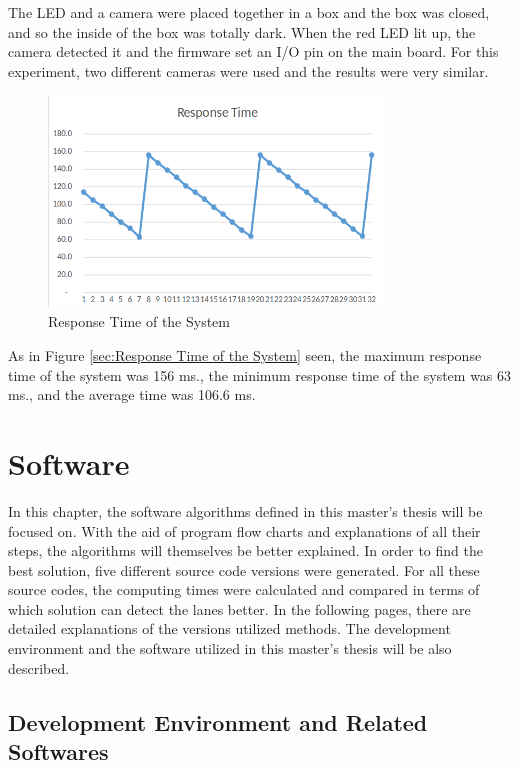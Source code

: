 The LED and a camera were placed together in a box and the box was closed, and so the inside of the box was totally dark. When the red LED lit up, the camera detected it and the firmware set an I/O pin on the main board. For this experiment, two different cameras were used and the results were very similar.


\begin{figure}[H]
 \centering
  \includegraphics[width=0.8\textwidth]{./Bilder/Response_Time2.png}		 \caption{Response Time of the System}
  \label{fig:Response_Time_of_the_System}
\end{figure}


As in Figure \ref{sec:Response Time of the System} seen, the maximum response time of the system was 156 ms., the minimum
response time of the system was 63 ms., and the average time was 106.6 ms.




%
\section{Software}\label{sec:Software}


In this chapter, the software algorithms defined in this master's thesis will be focused on. With the aid of program flow charts and explanations of all their steps, the algorithms will themselves be better explained. In order to find the best solution, five different source code versions were generated. For all these source codes, the computing times were calculated and compared in terms of which solution can detect the lanes better. In the following pages, there are detailed explanations of the versions utilized methods. The development environment and the software utilized in this master's thesis will be also described.

%
\subsection{Development Environment and Related Softwares}
\label{sec:Development Environment and Related Softwares}

